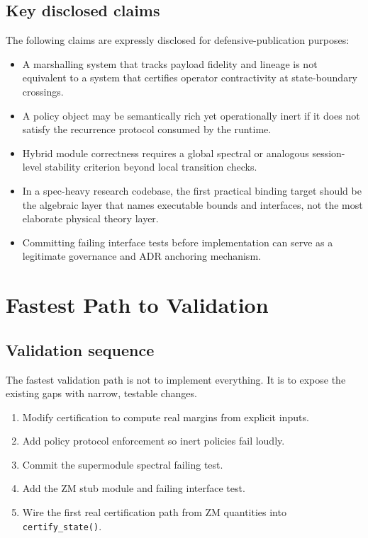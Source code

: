 \documentclass[11pt]{article}
\begin{document}
\subsection{Key disclosed claims}

The following claims are expressly disclosed for defensive-publication purposes:

\begin{itemize}
\item A marshalling system that tracks payload fidelity and lineage is not equivalent to a system that certifies operator contractivity at state-boundary crossings.
\item A policy object may be semantically rich yet operationally inert if it does not satisfy the recurrence protocol consumed by the runtime.
\item Hybrid module correctness requires a global spectral or analogous session-level stability criterion beyond local transition checks.
\item In a spec-heavy research codebase, the first practical binding target should be the algebraic layer that names executable bounds and interfaces, not the most elaborate physical theory layer.
\item Committing failing interface tests before implementation can serve as a legitimate governance and ADR anchoring mechanism.
\end{itemize}

\section{Fastest Path to Validation}

\subsection{Validation sequence}

The fastest validation path is not to implement everything. It is to expose the existing gaps with narrow, testable changes.

\begin{enumerate}[label=\arabic*.]
\item Modify certification to compute real margins from explicit inputs.
\item Add policy protocol enforcement so inert policies fail loudly.
\item Commit the supermodule spectral failing test.
\item Add the ZM stub module and failing interface test.
\item Wire the first real certification path from ZM quantities into \texttt{certify\_state()}.
\end{enumerate}
\end{document}
